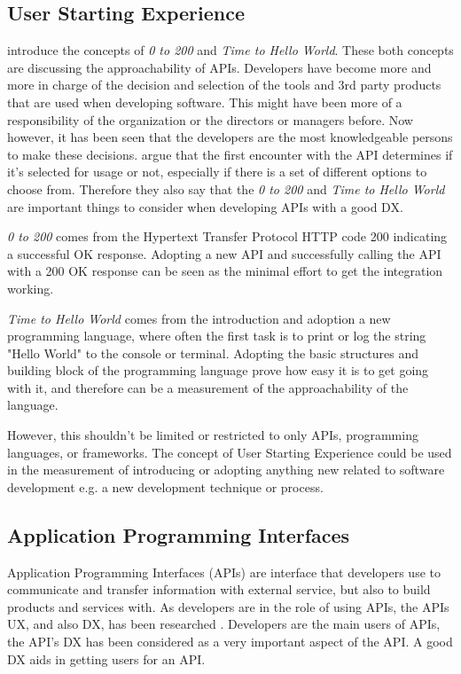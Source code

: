 \documentclass[english, 12pt, a4paper, sci, utf8, a-1b, online]{aaltothesis}
\begin{document}
\subsection{User Starting Experience}


\cite{api-designers} introduce the concepts of \textit{0 to 200} and \textit{Time to Hello World}. These both concepts are discussing the approachability of APIs. Developers have become more and more in charge of the decision and selection of the tools and 3rd party products that are used when developing software. This might have been more of a responsibility of the organization or the directors or managers before. Now however, it has been seen that the developers are the most knowledgeable persons to make these decisions. \cite{api-designers} argue that the first encounter with the API determines if it's selected for usage or not, especially if there is a set of different options to choose from. Therefore they also say that the \textit{0 to 200} and \textit{Time to Hello World} are important things to consider when developing APIs with a good DX.

\textit{0 to 200} comes from the Hypertext Transfer Protocol HTTP code 200 indicating a successful OK response. Adopting a new API and successfully calling the API with a 200 OK response can be seen as the minimal effort to get the integration working.

\textit{Time to Hello World} comes from the introduction and adoption a new programming language, where often the first task is to print or log the string "Hello World" to the console or terminal. Adopting the basic structures and building block of the programming language prove how easy it is to get going with it, and therefore can be a measurement of the approachability of the language.

However, this shouldn't be limited or restricted to only APIs, programming languages, or frameworks. The concept of User Starting Experience could be used in the measurement of introducing or adopting anything new related to software development e.g. a new development technique or process.

\subsection{Application Programming Interfaces}

Application Programming Interfaces (APIs) are interface that developers use to communicate and transfer information with external service, but also to build products and services with. As developers are in the role of using APIs, the APIs UX, and also DX, has been researched \citep{api-designers}. Developers are the main users of APIs, the API's DX has been considered as a very important aspect of the API. A good DX aids in getting users for an API.
\end{document}
